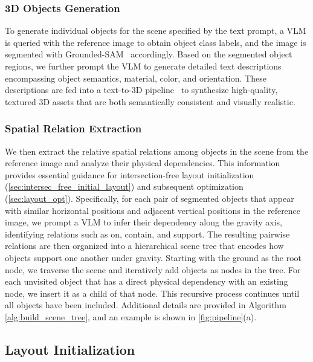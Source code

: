 \subsubsection{3D Objects Generation} 
\label{sec:3d_generation}


To generate individual objects for the scene specified by the text prompt, a VLM is queried with the reference image to obtain object class labels, and the image is segmented with Grounded-SAM~\cite{kirillov2023segany, ren2024grounded, liu2023grounding} accordingly. Based on the segmented object regions, we further prompt the VLM to generate detailed text descriptions encompassing object semantics, material, color, and orientation. These descriptions are fed into a text-to-3D pipeline~\cite{hunyuan3d22025tencent} to synthesize high-quality, textured 3D assets that are both semantically consistent and visually realistic.




\subsubsection{Spatial Relation Extraction}\label{sec:scene_analysis}


We then extract the relative spatial relations among objects in the scene from the reference image and analyze their physical dependencies. This information provides essential guidance for intersection-free layout initialization (\autoref{sec:intersec_free_initial_layout}) and subsequent optimization (\autoref{sec:layout_opt}). Specifically, for each pair of segmented objects that appear with similar horizontal positions and adjacent vertical positions in the reference image, we prompt a VLM to infer their dependency along the gravity axis, identifying relations such as on, contain, and support. The resulting pairwise relations are then organized into a hierarchical scene tree that encodes how objects support one another under gravity. Starting with the ground as the root node, we traverse the scene and iteratively add objects as nodes in the tree. For each unvisited object that has a direct physical dependency with an existing node, we insert it as a child of that node. This recursive process continues until all objects have been included. Additional details are provided in Algorithm \ref{alg:build_scene_tree}, and an example is shown in \autoref{fig:pipeline}(a).


\subsection{Layout Initialization}\label{sec:intersec_free_initial_layout}



